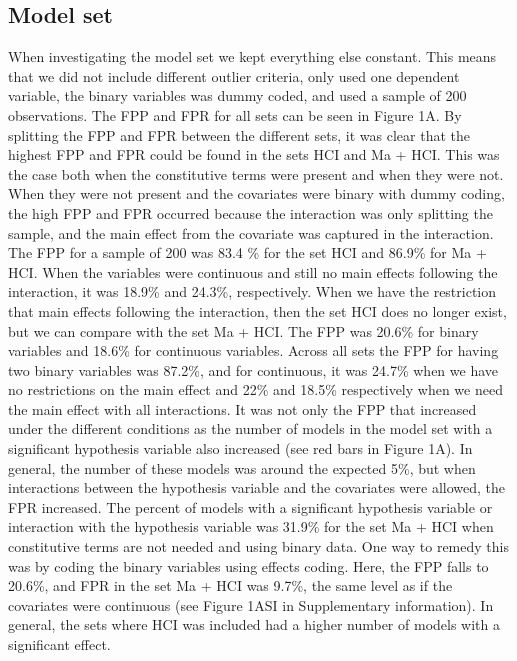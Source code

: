 \subsection{Model set}
When investigating the model set we kept everything else constant. This means that we did not include different outlier criteria, only used one dependent variable, the binary variables was dummy coded, and used a sample of 200 observations. The FPP and FPR for all sets can be seen in Figure 1A.
By splitting the FPP and FPR between the different sets, it was clear that the highest FPP and FPR could be found in the sets HCI and Ma + HCI. This was the case both when the constitutive terms were present and when they were not. When they were not present and the covariates were binary with dummy coding, the high FPP and FPR occurred because the interaction was only splitting the sample, and the main effect from the covariate was captured in the interaction. The FPP for a sample of 200 was 83.4 \% for the set HCI and 86.9\% for Ma + HCI. When the variables were continuous and still no main effects following the interaction, it was 18.9\% and 24.3\%, respectively. When we have the restriction that main effects following the interaction, then the set HCI does no longer exist, but we can compare with the set Ma + HCI. The FPP was 20.6\% for binary variables and 18.6\% for continuous variables. Across all sets the FPP for having two binary variables was 87.2\%, and for continuous, it was 24.7\% when we have no restrictions on the main effect and 22\% and 18.5\% respectively when we need the main effect with all interactions. 
It was not only the FPP that increased under the different conditions as the number of models in the model set with a significant hypothesis variable also increased (see red bars in Figure 1A). In general, the number of these models was around the expected 5\%, but when interactions between the hypothesis variable and the covariates were allowed, the FPR increased. The percent of models with a significant hypothesis variable or interaction with the hypothesis variable was 31.9\% for the set Ma + HCI when constitutive terms are not needed and using binary data. One way to remedy this was by coding the binary variables using effects coding. Here, the FPP falls to 20.6\%, and FPR in the set Ma + HCI was 9.7\%, the same level as if the covariates were continuous (see Figure 1ASI in Supplementary information). In general, the sets where HCI was included had a higher number of models with a significant effect. 

